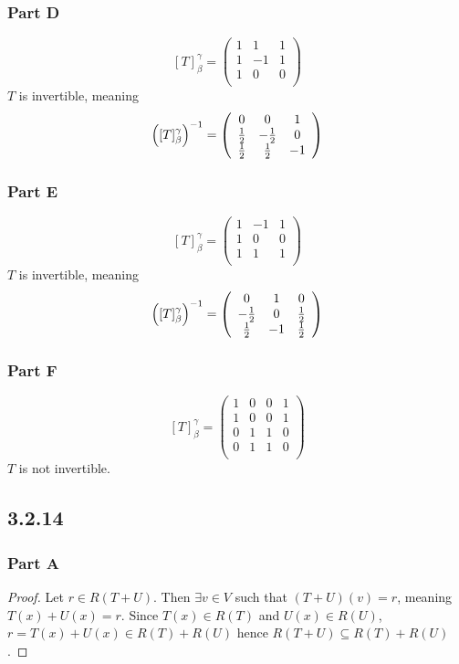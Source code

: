 \documentclass[12pt,titlepage]{extarticle}
\begin{document}
\subsubsection*{Part D}
\[
    [T]_{\beta}^{\gamma} = \left(\begin{array}{ccc}1&1&1\\1&-1&1\\1&0&0\\\end{array}\right)
\]
$T$ is invertible, meaning
\[
    \qty([T]_{\beta}^{\gamma})^{-1} = \left(\begin{array}{ccc}0&0&1\\\frac{1}{2}&-\frac{1}{2}&0\\\frac{1}{2}&\frac{1}{2}&-1\\\end{array}\right)
\]

\subsubsection*{Part E}
\[
    [T]_{\beta}^{\gamma} = \left(\begin{array}{ccc}1&-1&1\\1&0&0\\1&1&1\\\end{array}\right)
\]
$T$ is invertible, meaning
\[
    \qty([T]_{\beta}^{\gamma})^{-1} = \left(\begin{array}{ccc}0&1&0\\-\frac{1}{2}&0&\frac{1}{2}\\\frac{1}{2}&-1&\frac{1}{2}\\\end{array}\right)
\]


\subsubsection*{Part F}
\[
    [T]_{\beta}^{\gamma} = \left(\begin{array}{cccc}1&0&0&1\\1&0&0&1\\0&1&1&0\\0&1&1&0\\\end{array}\right)
\]
$T$ is not invertible.

\subsection*{3.2.14}
\subsubsection*{Part A}
\begin{proof}
    Let $r \in R(T + U)$. Then $\exists v \in V$ such that $(T + U)(v) = r$, meaning $T(x) + U(x) = r$. Since $T(x) \in R(T)$ and $U(x) \in R(U)$, $r = T(x) + U(x) \in R(T) + R(U)$ hence $R(T+U) \subseteq R(T) + R(U)$.
\end{proof}
\end{document}
